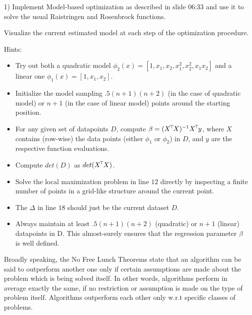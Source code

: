

\renewcommand{\course}{Optimization}
\renewcommand{\coursepicture}{optim}
\renewcommand{\coursedate}{Summer 2015}
\renewcommand{\exnum}{11}

\exercises
{}
\exercisestitle



1) Implement Model-based optimization as described in slide 06:33 and use it to
solve the usual Raistringen and Rosenbrock functions.

Visualize the current estimated model at each step of the optimization procedure.

Hints:
\begin{itemize}
  \item Try out both a quadratic model $\phi_2(x) = [ 1, x_1, x_2, x_1^2, x_2^2, x_1x_2 ]$ and a linear one $\phi_1(x) = [1, x_1, x_2 ]$.
  \item Initialize the model sampling $.5 (n+1)(n+2)$ (in the case of quadratic model) or $n+1$ (in the case of linear model) points around the starting position.
  \item For any given set of datapoints $D$, compute $\beta = (X^{\!\top\!} X)^{-1} X^{\!\top\!} y$, where $X$ contains (row-wise) the data points (either $\phi_1$ or $\phi_2$) in $D$, and $y$ are the respective function evaluations.
  \item Compute $det(D)$ as $det(X^{\!\top\!} X)$.
  \item Solve the local maximization problem in line $12$ directly by inspecting a finite number of points in a grid-like structure around the current point.
  \item The $\Delta$ in line $18$ should just be the current dataset $D$.
  \item Always maintain at least $.5 (n+1)(n+2)$ (quadratic) or $n+1$ (linear) datapoints in D. This almost-surely ensures that the regression parameter $\beta$ is well defined.
\end{itemize}



Broadly speaking, the No Free Lunch Theorems state that an algorithm can be
said to outperform another one only if certain assumptions are made about the
problem which is being solved itself.  In other words, algorithms perform in
average exactly the same, if no restriction or assumption is made on the type
of problem itself.  Algorithms outperform each other only w.r.t specific
classes of problems.

